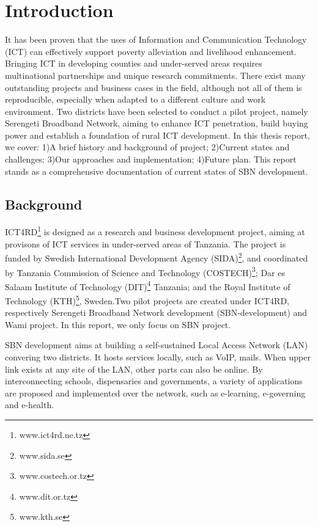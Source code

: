 \chapter{Introduction}
It has been proven that the uses of Information and Communication Technology (ICT) can effectively support poverty alleviation and livelihood enhancement\cite{XXX}. Bringing ICT in developing counties and under-served areas requires multinational partnerships and unique research commitments. There exist many outstanding projects and business cases in the field, although not all of them is reproducible, especially when adapted to a different culture and work environment.
Two districts have been selected to conduct a pilot project, namely Serengeti Broadband Network, aiming to enhance ICT penetration, build buying power and establish a foundation of rural ICT development. In this thesis report, we cover: 1)A brief history and background of project; 2)Current states and challenges; 3)Our approaches and implementation; 4)Future plan. This report stands as a comprehensive documentation of current states of SBN development.


\section{Background}
ICT4RD\footnote{www.ict4rd.ne.tz} is designed as a research and business development project, aiming at provisons of ICT services in under-served areas of Tanzania. The project is funded by Swedish International Development Agency (SIDA)\footnote{www.sida.se}, and coordinated by Tanzania Commission of Science and Technology (COSTECH)\footnote{www.costech.or.tz}; Dar es Salaam Institute of Technology (DIT)\footnote{www.dit.or.tz} Tanzania; and the Royal Institute of Technology (KTH)\footnote{www.kth.se}, Sweden.Two pilot projects are created under ICT4RD, respectively Serengeti Broadband Network development (SBN-development) and Wami project. In this report, we only focus on SBN project.

SBN development aims at building a self-sustained Local Access Network (LAN) convering two districts\cite{nungu_thesis}. It hosts services locally, such as VoIP, mails. When upper link exists at any site of the LAN, other parts can also be online. By interconnecting schools, dispensaries and governments, a variety of applications are proposed and implemented over the network, such as e-learning, e-governing and e-health.

